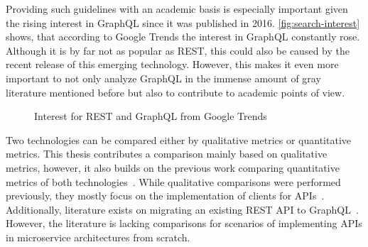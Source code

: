 
Providing such guidelines with an academic basis is especially important given the rising interest in GraphQL since it was published in 2016.
\autoref{fig:search-interest} shows, that according to Google Trends the interest in GraphQL constantly rose.
Although it is by far not as popular as \ac{REST}, this could also be caused by the recent release of this emerging technology.
However, this makes it even more important to not only analyze GraphQL in the immense amount of gray literature mentioned before but also to contribute to academic points of view.

\begin{figure}[h!]
    \centering
    \caption{Interest for \acs{REST} and GraphQL from Google Trends}\label{fig:search-interest}    
\end{figure}

Two technologies can be compared either by qualitative metrics or quantitative metrics.
This thesis contributes a comparison mainly based on qualitative metrics, however, it also builds on the previous work comparing quantitative metrics of both technologies~\cite{Brito2019,Brito2020,Wittern2018,Seabra2019}.
While qualitative comparisons were performed previously, they mostly focus on the implementation of clients for \acp{API}~\cite{Brito2020}.
Additionally, literature exists on migrating an existing \ac{REST} \ac{API} to GraphQL~\cite{Vogel2017, Lama2019, Wittern2018}.
However, the literature is lacking comparisons for scenarios of implementing \acp{API} in microservice architectures from scratch.

